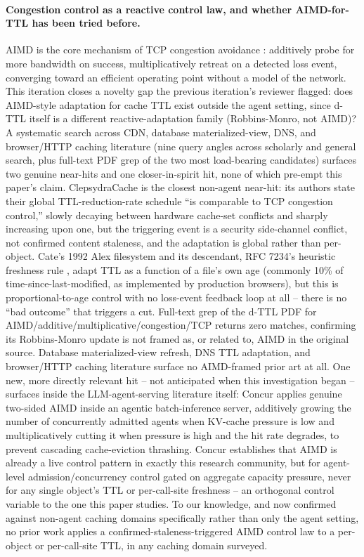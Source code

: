 \documentclass[11pt,letterpaper]{article}
\begin{document}
\paragraph{Congestion control as a reactive control law, and whether AIMD-for-TTL has been tried before.} AIMD is
the core mechanism of TCP congestion avoidance \citep{Jacobson1988,Chiu1989}: additively probe for more bandwidth on success,
multiplicatively retreat on a detected loss event, converging toward an efficient operating point without a
model of the network. This iteration closes a novelty gap the previous iteration's reviewer flagged: does
AIMD-style adaptation for cache TTL exist outside the agent setting, since d-TTL itself is a different
reactive-adaptation family (Robbins-Monro, not AIMD)? A systematic search across CDN, database
materialized-view, DNS, and browser/HTTP caching literature (nine query angles across scholarly and general
search, plus full-text PDF grep of the two most load-bearing candidates) surfaces two genuine near-hits and
one closer-in-spirit hit, none of which pre-empt this paper's claim. ClepsydraCache \citep{Thoma2023} is the closest
non-agent near-hit: its authors state their global TTL-reduction-rate schedule ``is comparable to TCP
congestion control,'' slowly decaying between hardware cache-set conflicts and sharply increasing upon one,
but the triggering event is a security side-channel conflict, not confirmed content staleness, and the
adaptation is global rather than per-object. Cate's 1992 Alex filesystem and its descendant, RFC 7234's
heuristic freshness rule \citep{Cate1992,Fielding2014}, adapt TTL as a function of a file's own age (commonly 10\% of
time-since-last-modified, as implemented by production browsers), but this is proportional-to-age control
with no loss-event feedback loop at all -- there is no ``bad outcome'' that triggers a cut. Full-text grep of
the d-TTL PDF for AIMD/additive/multiplicative/congestion/TCP returns zero matches, confirming its
Robbins-Monro update is not framed as, or related to, AIMD in the original source. Database materialized-view
refresh, DNS TTL adaptation, and browser/HTTP caching literature surface no AIMD-framed prior art at all.
One new, more directly relevant hit -- not anticipated when this investigation began -- surfaces inside the
LLM-agent-serving literature itself: Concur \citep{Chen2025} applies genuine two-sided AIMD inside an agentic
batch-inference server, additively growing the number of concurrently admitted agents when KV-cache
pressure is low and multiplicatively cutting it when pressure is high and the hit rate degrades, to prevent
cascading cache-eviction thrashing. Concur establishes that AIMD is already a live control pattern in
exactly this research community, but for agent-level admission/concurrency control gated on aggregate
capacity pressure, never for any single object's TTL or per-call-site freshness -- an orthogonal control
variable to the one this paper studies. To our knowledge, and now confirmed against non-agent caching
domains specifically rather than only the agent setting, no prior work applies a confirmed-staleness-triggered
AIMD control law to a per-object or per-call-site TTL, in any caching domain surveyed.
\end{document}
